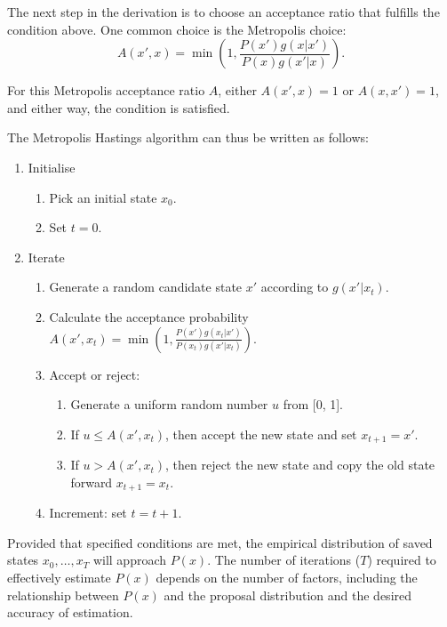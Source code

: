 The next step in the derivation is to choose an acceptance ratio that fulfills the condition above. One common choice is the Metropolis choice:
\[
A(x', x) = \min \left( 1, \frac{P(x') g(x | x')}{P(x) g(x' | x)} \right).
\]

For this Metropolis acceptance ratio \( A \), either \( A(x', x) = 1 \) or \( A(x, x') = 1 \), and either way, the condition is satisfied.

The Metropolis Hastings algorithm can thus be written as follows:
\begin{enumerate}
    \item Initialise
    \begin{enumerate}
        \item Pick an initial state \( x_0 \).
        \item Set \( t = 0 \).
    \end{enumerate}
    \item Iterate
    \begin{enumerate}
        \item Generate a random candidate state \( x' \) according to \( g(x' | x_t) \).
        \item Calculate the acceptance probability \( A(x', x_t) = \min \left( 1, \frac{P(x') g(x_t | x')}{P(x_t) g(x' | x_t)} \right) \).
        \item Accept or reject:
        \begin{enumerate}
            \item Generate a uniform random number \( u \) from [0, 1].
            \item If \( u \leq A(x', x_t) \), then accept the new state and set \( x_{t+1} = x' \).
            \item If \( u > A(x', x_t) \), then reject the new state and copy the old state forward \( x_{t+1} = x_t \).
        \end{enumerate}
        \item Increment: set \( t = t + 1 \).
    \end{enumerate}
\end{enumerate}

Provided that specified conditions are met, the empirical distribution of saved states \( x_0, \ldots, x_T \) will approach \( P(x) \). The number of iterations (\( T \)) required to effectively estimate \( P(x) \) depends on the number of factors, including the relationship between \( P(x) \) and the proposal distribution and the desired accuracy of estimation.

